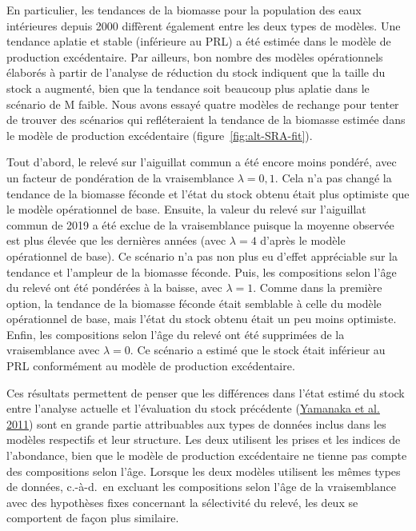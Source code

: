 \documentclass[french,11pt]{book}
\begin{document}
En particulier, les tendances de la biomasse pour la population des eaux intérieures depuis 2000 diffèrent également entre les deux types de modèles. Une tendance aplatie et stable (inférieure au PRL) a été estimée dans le modèle de production excédentaire. Par ailleurs, bon nombre des modèles opérationnels élaborés à partir de l'analyse de réduction du stock indiquent que la taille du stock a augmenté, bien que la tendance soit beaucoup plus aplatie dans le scénario de M faible. Nous avons essayé quatre modèles de rechange pour tenter de trouver des scénarios qui refléteraient la tendance de la biomasse estimée dans le modèle de production excédentaire (figure~\ref{fig:alt-SRA-fit}).

Tout d'abord, le relevé sur l'aiguillat commun a été encore moins pondéré, avec un facteur de pondération de la vraisemblance \(\lambda = 0,1\). Cela n'a pas changé la tendance de la biomasse féconde et l'état du stock obtenu était plus optimiste que le modèle opérationnel de base. Ensuite, la valeur du relevé sur l'aiguillat commun de 2019 a été exclue de la vraisemblance puisque la moyenne observée est plus élevée que les dernières années (avec \(\lambda = 4\) d'après le modèle opérationnel de base). Ce scénario n'a pas non plus eu d'effet appréciable sur la tendance et l'ampleur de la biomasse féconde. Puis, les compositions selon l'âge du relevé ont été pondérées à la baisse, avec \(\lambda = 1\). Comme dans la première option, la tendance de la biomasse féconde était semblable à celle du modèle opérationnel de base, mais l'état du stock obtenu était un peu moins optimiste. Enfin, les compositions selon l'âge du relevé ont été supprimées de la vraisemblance avec \(\lambda = 0\). Ce scénario a estimé que le stock était inférieur au PRL conformément au modèle de production excédentaire.

Ces résultats permettent de penser que les différences dans l'état estimé du stock entre l'analyse actuelle et l'évaluation du stock précédente (\protect\hyperlink{ref-yamanaka2011}{Yamanaka et al. 2011}) sont en grande partie attribuables aux types de données inclus dans les modèles respectifs et leur structure. Les deux utilisent les prises et les indices de l'abondance, bien que le modèle de production excédentaire ne tienne pas compte des compositions selon l'âge. Lorsque les deux modèles utilisent les mêmes types de données, c.-à-d.~en excluant les compositions selon l'âge de la vraisemblance avec des hypothèses fixes concernant la sélectivité du relevé, les deux se comportent de façon plus similaire.
\end{document}
